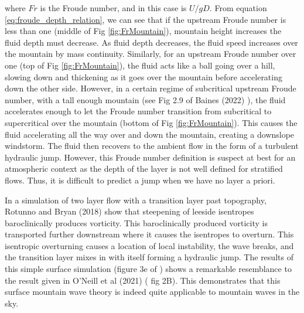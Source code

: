 \documentclass[12pt]{article}
\begin{document}
where $Fr$ is the Froude number, and in this case is $U/gD$. From equation \ref{eq:froude_depth_relation}, we can see that if the upstream Froude number is less than one (middle of Fig \ref{fig:FrMountain}), mountain height increases the fluid depth must decrease. As fluid depth decreases, the fluid speed increases over the mountain by mass continuity. Similarly, for an upstream Froude number over one (top of Fig \ref{fig:FrMountain}), the fluid acts like a ball going over a hill, slowing down and thickening as it goes over the mountain before accelerating down the other side. However, in a certain regime of subcritical upstream Froude number, with a tall enough mountain (see Fig 2.9 of Baines (2022) \cite{baines_topographic_2022}), the fluid accelerates enough to let the Froude number transition from subcritical to supercritical over the mountain (bottom of Fig \ref{fig:FrMountain}). This causes the fluid accelerating all the way over and down the mountain, creating a downslope windstorm. The fluid then recovers to the ambient flow in the form of a turbulent hydraulic jump. However, this Froude number definition is suspect at best for an atmospheric context \cite{markowski_mesoscale_2011} as the depth of the layer is not well defined for stratified flows. Thus, it is difficult to predict a jump when we have no layer a priori.

In a simulation of two layer flow with a transition layer past topography, Rotunno and Bryan (2018) \cite{rotunno_numerical_2018} \cite{rotunno_numerical_2020} show that steepening of leeside isentropes baroclinically produces vorticity. This baroclinically produced vorticity is transported further downstream where it causes the isentropes to overturn. This isentropic overturning causes a location of local instability, the wave breaks, and the transition layer mixes in with itself forming a hydraulic jump. The results of this simple surface simulation (figure 3e of \cite{rotunno_numerical_2018}) shows a remarkable resemblance to the result given in O'Neill et al (2021) (\cite{oneill_hydraulic_2021} fig 2B). This demonstrates that this surface mountain wave theory is indeed quite applicable to mountain waves in the sky.
\end{document}
